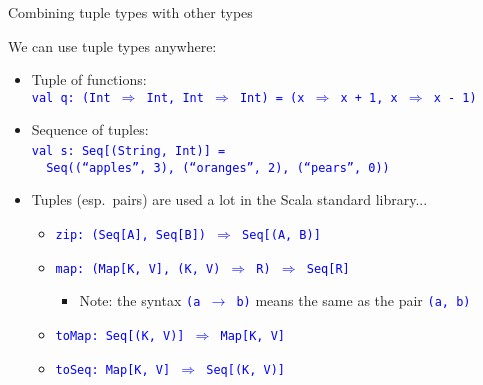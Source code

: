 \documentclass[english]{beamer}
\begin{document}
\begin{frame}{Combining tuple types with other types}

We can use tuple types anywhere:
\begin{itemize}
\item Tuple of functions:\\
 \texttt{\textcolor{blue}{\footnotesize{}val q:\ (Int $\Rightarrow$
Int, Int $\Rightarrow$ Int) = (x $\Rightarrow$ x + 1, x $\Rightarrow$
x - 1)}}{\footnotesize\par}
\item Sequence of tuples:\\
 \texttt{\textcolor{blue}{\footnotesize{}val s:\ Seq{[}(String, Int){]}
=}}~\\
\texttt{\textcolor{blue}{\footnotesize{} \  Seq((``apples'', 3),
(``oranges'', 2), (``pears'', 0))}}{\footnotesize\par}
\item Tuples (esp.\ pairs) are used a lot in the Scala standard library...
\begin{itemize}
\item \texttt{\textcolor{blue}{\footnotesize{}zip:\ (Seq{[}A{]}, Seq{[}B{]})
$\Rightarrow$ Seq{[}(A, B){]}}}{\footnotesize\par}
\item \texttt{\textcolor{blue}{\footnotesize{}map:\ (Map{[}K, V{]}, (K,
V) $\Rightarrow$ R) $\Rightarrow$ Seq{[}R{]}}}{\footnotesize\par}
\begin{itemize}
\item Note: the syntax \texttt{\textcolor{blue}{\footnotesize{}(a $\rightarrow$
b)}} means the same as the pair \texttt{\textcolor{blue}{\footnotesize{}(a,
b) }}{\footnotesize\par}
\end{itemize}
\item \texttt{\textcolor{blue}{\footnotesize{}toMap:\ Seq{[}(K, V){]} $\Rightarrow$
Map{[}K, V{]}}}{\footnotesize\par}
\item \texttt{\textcolor{blue}{\footnotesize{}toSeq:\ Map{[}K, V{]} $\Rightarrow$
Seq{[}(K, V){]}}}{\footnotesize\par}
\end{itemize}
\end{itemize}
\end{frame}
\end{document}
